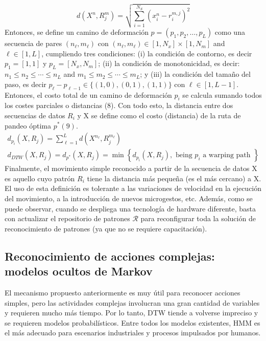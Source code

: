 \documentclass[10pt]{article}
\begin{document}
$$
d\left(X^{n}, R_{j}^{m}\right)=\sqrt{\sum_{i=1}^{N_{S}}\left(x_{i}^{n}-r_{i}^{m, j}\right)^{2}}
$$
Entonces, se define un camino de deformación $p=\left(p_{1}, p_{2}, \ldots, p_{L}\right)$ como una secuencia de pares $\left(n_{\ell}, m_{\ell}\right)$ con $\left(n_{\ell}, m_{\ell}\right) \in\left[1, N_{x}\right] \times\left[1, N_{m}\right]$ and $\ell \in[1, L]$, cumpliendo tres condiciones: (i) la condición de contorno, es decir $p_{1}=[1,1]$ y $p_{L}=\left[N_{x}, N_{m}\right]$; (ii) la condición de monotonicidad, es decir: $n_{1} \leq n_{2} \leq \cdots \leq n_{L}$ and $m_{1} \leq m_{2} \leq \cdots \leq m_{L}$; y (iii) la condición del tamaño del paso, es decir  $p_{\ell}-p_{\ell-1} \in\{(1,0),(0,1),(1,1)\}$ con $\ell \in[1, L-1]$.
Entonces, el costo total de un camino de deformación $p_{i}$ se calcula sumando todos los costes parciales o distancias (8). Con todo esto, la distancia entre dos secuencias de datos $R_{i}$ y X se define como el costo (distancia) de la ruta de pandeo óptima $p^{*}(9)$.
$$
\begin{gathered}
d_{p_{i}}\left(X, R_{j}\right)=\sum_{\ell=1}^{L} d\left(X^{n_{\ell}}, R_{j}^{m_{\ell}}\right) \\
d_{D T W}\left(X, R_{j}\right)=d_{p^{*}}\left(X, R_{j}\right)=\min \left\{d_{p_{i}}\left(X, R_{j}\right), \text { being } p_{i} \text { a warping path }\right\}
\end{gathered}
$$
Finalmente, el movimiento simple reconocido a partir de la secuencia de datos X es aquello cuyo patrón $R_{i}$  tiene la distancia más pequeña (es el más cercano) a X.
El uso de esta definición es tolerante a las variaciones de velocidad en la ejecución del movimiento, a la introducción de nuevos microgestos, etc. Además, como se puede observar, cuando se despliega una tecnología de hardware diferente, basta con actualizar el repositorio de patrones $\mathcal{R}$ para reconfigurar toda la solución de reconocimiento de patrones (ya que no se requiere capacitación). 



\subsection{Reconocimiento de acciones complejas: modelos ocultos de Markov}
El mecanismo propuesto anteriormente es muy útil para reconocer acciones simples, pero las actividades complejas involucran una gran cantidad de variables y requieren mucho más tiempo. Por lo tanto, DTW tiende a volverse impreciso y se requieren modelos probabilísticos. Entre todos los modelos existentes, HMM es el más adecuado para escenarios industriales y procesos impulsados por humanos.
\end{document}
